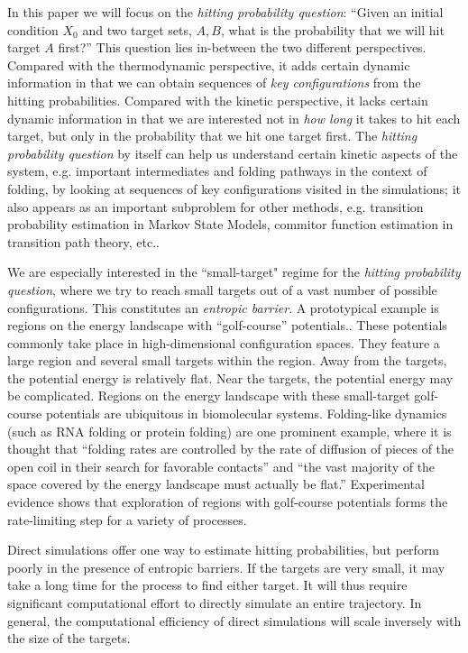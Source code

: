 \documentclass[english, aip, jcp, priprint, graphicx,floatfix]{revtex4-1}
\theoremstyle{plain}
\theoremstyle{definition}
\theoremstyle{plain}
\begin{document}
In this paper we will focus on the \emph{hitting probability question}: ``Given an initial condition $X_0$ and two target sets, $A,B$, what is the probability that we will hit target $A$ first?'' This question lies in-between the two different perspectives. Compared with the thermodynamic perspective, it adds certain dynamic information in that we can obtain sequences of \emph{key configurations} from the hitting probabilities. Compared with the kinetic perspective, it lacks certain dynamic information in that we are interested not in \emph{how long} it takes to hit each target, but only in the probability that we hit one target first. The \emph{hitting probability question} by itself can help us understand certain kinetic aspects of the system, e.g. important intermediates and folding pathways in the context of folding, by looking at sequences of key configurations visited in the simulations; it also appears as an important subproblem for other methods, e.g. transition probability estimation in Markov State Models, commitor function estimation in transition path theory, etc..

We are especially interested in the ``small-target" regime for the \emph{hitting probability question}, where we try to reach small targets out of a vast number of possible configurations. This constitutes an \emph{entropic barrier}. A prototypical example is regions on the energy landscape with ``golf-course'' potentials.\cite{bicout2000entropic, Baum1986-we, Wille1987-tf}. These potentials commonly take place in high-dimensional configuration spaces. They feature a large region and several small targets within the region.  Away from the targets, the potential energy is relatively flat.  Near the targets, the potential energy may be complicated. Regions on the energy landscape with these small-target golf-course potentials are ubiquitous in biomolecular systems. Folding-like dynamics (such as RNA folding or protein folding) are one prominent example, where it is thought that ``folding rates are controlled by the rate of diffusion of pieces of the open coil in their search for favorable contacts'' and ``the vast majority of the space covered by the energy landscape must actually be flat.''\cite{McLeish2005-dq} Experimental evidence shows that exploration of regions with golf-course potentials forms the rate-limiting step for a variety of processes.\cite{Teschner1987-qs, Jacob1999-bs, Goldberg1999-mv, Plaxco1998-iv}

Direct simulations offer one way to estimate hitting probabilities, but perform poorly in the presence of entropic barriers. If the targets are very small, it may take a long time for the process to find either target.  It will thus require significant  computational effort to directly simulate an entire trajectory. In general, the computational efficiency of direct simulations will scale inversely with the size of the targets.
\end{document}
